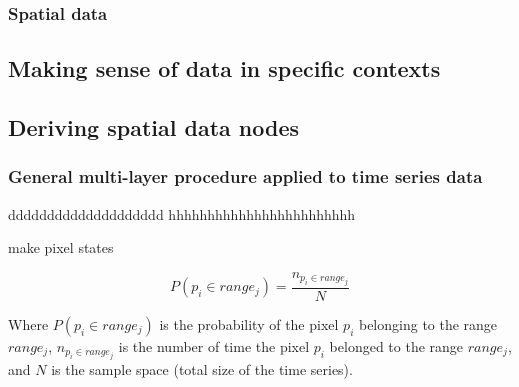 \documentclass[]{elsarticle} %
\begin{document}
\hypertarget{section_2_3_2}{%
\subsubsection{Spatial data}\label{section_2_3_2}}

\hypertarget{section_2_4}{%
\subsection{Making sense of data in specific contexts}\label{section_2_4}}

\hypertarget{section_2_5}{%
\subsection{Deriving spatial data nodes}\label{section_2_5}}

\hypertarget{section_2_5_1}{%
\subsubsection{General multi-layer procedure applied to time series data}\label{section_2_5_1}}

dddddddddddddddddddd hhhhhhhhhhhhhhhhhhhhhhhh

\begin{algorithm}[H]
\DontPrintSemicolon
\SetAlgoLined
{}
\BlankLine
{}
\caption{make pixel states}
\end{algorithm}

\begin{equation} 
P(p_i \in range_j) = \frac{n_{p_i \in range_j}}{N}
\label{eq:eq1}
\end{equation}

Where \(P(p_i \in range_j)\) is the probability of the pixel \(p_i\) belonging to the range \(range_j\), \(n_{p_i \in range_j}\) is the number of time the pixel \(p_i\) belonged to the range \(range_j\), and \(N\) is the sample space (total size of the time series).
\end{document}
